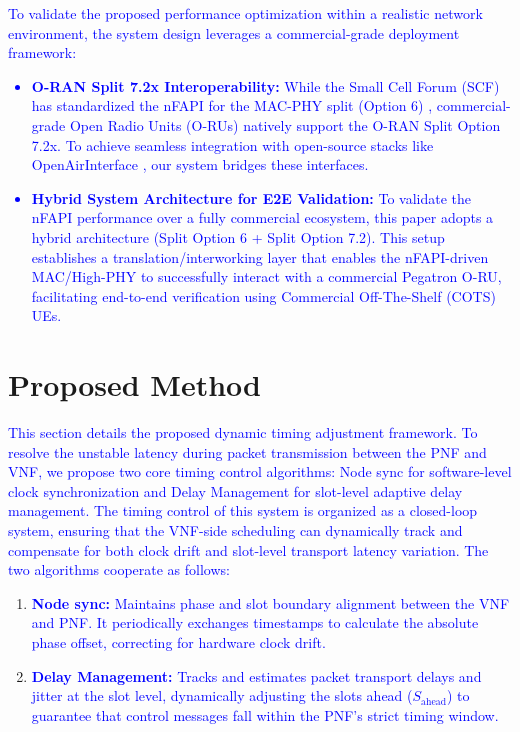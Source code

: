 \documentclass[10pt, conference, letterpaper]{IEEEtran}
\begin{document}
\textcolor{blue}{To validate the proposed performance optimization within a realistic network environment, the system design leverages a commercial-grade deployment framework:
\begin{itemize}
\item \textbf{O-RAN Split 7.2x Interoperability:} While the Small Cell Forum (SCF) has standardized the nFAPI for the MAC-PHY split (Option 6) \cite{Douros2018}, commercial-grade Open Radio Units (O-RUs) natively support the O-RAN Split Option 7.2x. To achieve seamless integration with open-source stacks like OpenAirInterface \cite{Wang2022}, our system bridges these interfaces.
\item \textbf{Hybrid System Architecture for E2E Validation:} To validate the nFAPI performance over a fully commercial ecosystem, this paper adopts a hybrid architecture (Split Option 6 + Split Option 7.2). This setup establishes a translation/interworking layer that enables the nFAPI-driven MAC/High-PHY to successfully interact with a commercial Pegatron O-RU, facilitating end-to-end verification using Commercial Off-The-Shelf (COTS) UEs.
\end{itemize}}

\section{Proposed Method}
\label{sec:proposed_method}

\textcolor{blue}{This section details the proposed dynamic timing adjustment framework. To resolve the unstable latency during packet transmission between the PNF and VNF, we propose two core timing control algorithms: Node sync for software-level clock synchronization and Delay Management for slot-level adaptive delay management. The timing control of this system is organized as a closed-loop system, ensuring that the VNF-side scheduling can dynamically track and compensate for both clock drift and slot-level transport latency variation. The two algorithms cooperate as follows:}
\begin{enumerate}
    \item \textcolor{blue}{\textbf{Node sync:} Maintains phase and slot boundary alignment between the VNF and PNF. It periodically exchanges timestamps to calculate the absolute phase offset, correcting for hardware clock drift.}
    \item \textcolor{blue}{\textbf{Delay Management:} Tracks and estimates packet transport delays and jitter at the slot level, dynamically adjusting the slots ahead ($S_{\mathrm{ahead}}$) to guarantee that control messages fall within the PNF's strict timing window.}
\end{enumerate}
\end{document}
